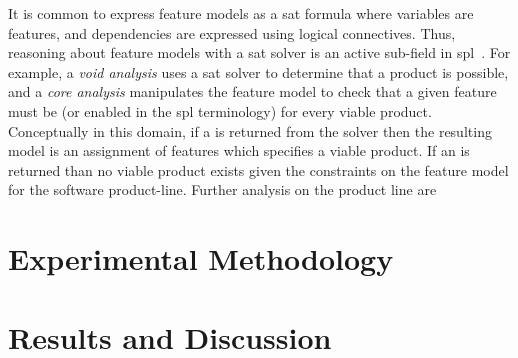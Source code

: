 It is common to express feature models as a \ac{sat} formula where variables are
features, and dependencies are expressed using logical connectives. Thus,
reasoning about feature models with a \ac{sat} solver is an active sub-field in
\acl{spl}~\cite{BSRC10,GBT+19,BSTRC06,TAK+:SE15}. For example, a \emph{void
  analysis} uses a \ac{sat} solver to determine that a product is possible, and
a \emph{core analysis} manipulates the feature model to check that a given
feature must be \tru{} (or enabled in the \ac{spl} terminology) for every viable
product. Conceptually in this domain, if a  is returned from the solver
then the resulting model is an assignment of features which specifies a viable
product. If an  is returned than no viable product exists given the
constraints on the feature model for the software product-line. Further analysis
on the product line are

\section{Experimental Methodology}

%
\section{Results and Discussion}



